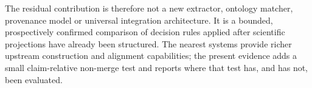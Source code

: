 The residual contribution is therefore not a new extractor, ontology matcher,
provenance model or universal integration architecture. It is a bounded,
prospectively confirmed comparison of decision rules applied after scientific
projections have already been structured. The nearest systems provide richer
upstream construction and alignment capabilities; the present evidence adds a
small claim-relative non-merge test and reports where that test has, and has
not, been evaluated.
\endinput

